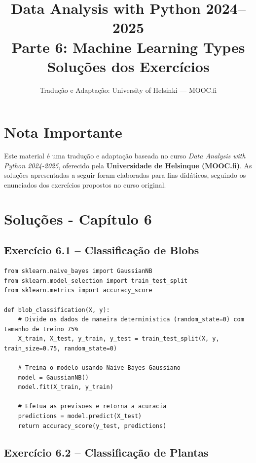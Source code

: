 \documentclass[11pt,a4paper]{article}
\title{\textbf{Data Analysis with Python 2024--2025}\\Parte 6: Machine Learning Types\\\large Soluções dos Exercícios}
\author{Tradução e Adaptação: University of Helsinki --- MOOC.fi}
\date{}
\begin{document}
\maketitle

\section*{Nota Importante}
Este material é uma tradução e adaptação baseada no curso \textit{Data Analysis with Python 2024-2025}, oferecido pela \textbf{Universidade de Helsinque (MOOC.fi)}. As soluções apresentadas a seguir foram elaboradas para fins didáticos, seguindo os enunciados dos exercícios propostos no curso original.

\tableofcontents
\newpage

\section{Soluções - Capítulo 6}

\subsection*{Exercício 6.1 -- Classificação de Blobs}

\begin{solucao}
\begin{lstlisting}
from sklearn.naive_bayes import GaussianNB
from sklearn.model_selection import train_test_split
from sklearn.metrics import accuracy_score

def blob_classification(X, y):
    # Divide os dados de maneira deterministica (random_state=0) com tamanho de treino 75%
    X_train, X_test, y_train, y_test = train_test_split(X, y, train_size=0.75, random_state=0)
    
    # Treina o modelo usando Naive Bayes Gaussiano
    model = GaussianNB()
    model.fit(X_train, y_train)
    
    # Efetua as previsoes e retorna a acuracia
    predictions = model.predict(X_test)
    return accuracy_score(y_test, predictions)
\end{lstlisting}
\end{solucao}

\subsection*{Exercício 6.2 -- Classificação de Plantas}
\end{document}

